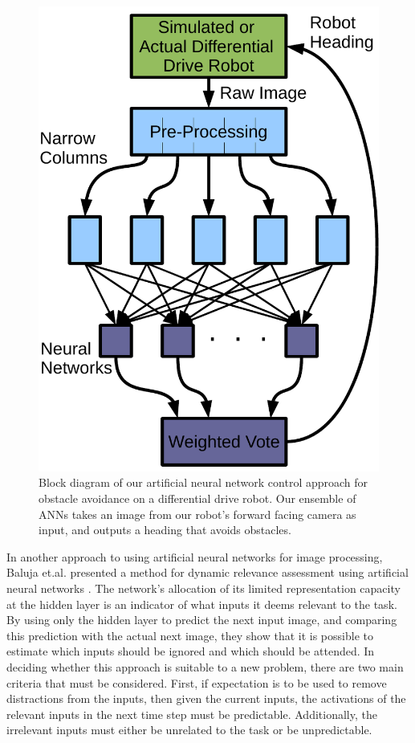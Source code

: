 \documentclass{article}
\begin{document}
		\begin{figure}[t]
			\begin{center}
				\includegraphics[width=\columnwidth]{block_diagram.pdf}
			\end{center}
			\caption{Block diagram of our artificial neural network control approach for obstacle avoidance on a differential drive robot.  Our ensemble of ANNs takes an image from our robot's forward facing camera as input, and outputs a heading that avoids obstacles.}
			\label{block_diagram}
		\end{figure}

		In another approach to using artificial neural networks for image processing, Baluja et.al. presented a method for dynamic relevance assessment using artificial neural networks \cite{Baluja97visionbasedfocus}. The network’s allocation of its limited representation capacity at the hidden layer is an indicator of what inputs it deems relevant to the task. By using only the hidden layer to predict the next input image, and comparing this prediction with the actual next image, they show that it is possible to estimate which inputs should be ignored and which should be attended. In deciding whether this approach is suitable to a new problem, there are two main criteria that must be considered. First, if expectation is to be used to remove distractions from the inputs, then given the current inputs, the activations of the relevant inputs in the next time step must be predictable. Additionally, the irrelevant inputs must either be unrelated to the task or be unpredictable.
\end{document}
